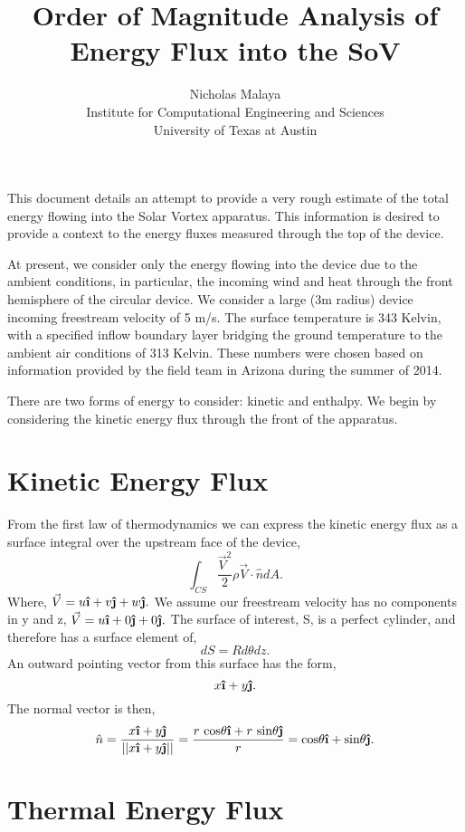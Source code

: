\documentclass{article}
\title{\bf{Order of Magnitude Analysis of Energy Flux into the SoV}}
\author{Nicholas Malaya \\ Institute for Computational Engineering and Sciences \\ University of Texas at Austin} \date{}
\newcommand{\uveci}{{\bm{\hat{\textnormal{\bfseries\i}}}}}
\newcommand{\uvecj}{{\bm{\hat{\textnormal{\bfseries\j}}}}}
\begin{document}
\maketitle

This document details an attempt to provide a very rough estimate of the
total energy flowing into the Solar Vortex apparatus. This information
is desired to provide a context to the energy fluxes measured through
the top of the device. 

At present, we consider only the energy flowing into the device due to
the ambient conditions, in particular, the incoming wind and heat
through the front hemisphere of the circular device. We consider a large
(3m radius) device incoming freestream velocity of 5 m/s. The surface
temperature is 343 Kelvin, with a specified inflow boundary layer
bridging the ground temperature to the ambient air conditions of 313
Kelvin. These numbers were chosen based on information provided by the
field team in Arizona during the summer of 2014. 

There are two forms of energy to consider: kinetic and enthalpy. We
begin by considering the kinetic energy flux through the front of the
apparatus. 

\section*{Kinetic Energy Flux}

From the first law of thermodynamics we can express the kinetic energy
flux as a surface integral over the upstream face of the device, 
\begin{equation*}
\int_{CS} \frac{\vec V^2}{2} \rho \vec V \cdot \hat n dA.
\end{equation*}
Where, $\vec V = u \uveci + v \uvecj + w \uvecj.$ 
We assume our freestream velocity has no components in y and z, 
$\vec V = u \uveci + 0 \uvecj + 0 \uvecj.$ The surface of interest, S,
is a perfect cylinder, and therefore has a surface element of, 
\begin{equation*}
dS = Rd\theta dz. 
\end{equation*}
An outward pointing vector from this surface has the form, 
\begin{equation*}
x \uveci + y \uvecj. 
\end{equation*}
The normal vector is then,
\begin{equation*}
\hat n = \frac{x \uveci + y \uvecj }{||x \uveci + y \uvecj||} =
 \frac{r\text{ cos}\theta \uveci + r\text{ sin}\theta \uvecj}{r} =
 \text{cos}\theta \uveci + \text{sin}\theta \uvecj. 
\end{equation*}

%




\section*{Thermal Energy Flux}
\end{document}
